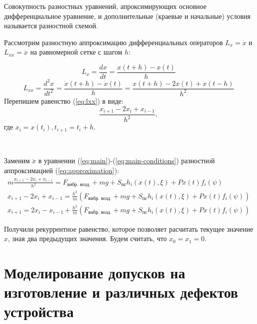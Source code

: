 \begin{definition}
    Совокупность разностных уравнений, апроксимирующих основное дифференциальное уравнение, и дополнительные
    (краевые и начальные) условия называется разностной схемой.
\end{definition}

Рассмотрим разностную аппроксимацию дифференциальных операторов $L_x = \dot{x}$ и $L_{xx} = \ddot{x}$ на равномерной сетке
с шагом $h$:

\begin{equation}
    L_x = \frac{dx}{dt} = \frac{x(t + h) - x(t)}{h}
\end{equation}
\begin{equation}
    \label{eq:lxx}
    L_{xx} = \frac{d^2x}{dt^2} = \frac{\dot{x}(t + h) - \dot{x}(t)}{h} = \frac{x(t + h) - 2x(t) + x(t - h)}{h^2}
\end{equation}
Перепишем равенство (\ref{eq:lxx}) в виде:
\begin{equation}
    \label{eq:approximation}
    \frac{x_{i+1} - 2x_i + x_{i-1}}{h^2},
\end{equation}
где $x_i = x(t_i), t_{i+1} = t_i + h$.

~\

\noindent Заменим $\ddot{x}$ в уравнении (\ref{eq:main})-(\ref{eq:main-conditions}) разностной аппроксимацией (\ref{eq:approximation}):
\begin{equation}
    \label{eq:result}
    \begin{aligned}
        m\frac{x_{i+1} - 2x_i + x_{i-1}}{h^2} = F_\text{вибр. возд.} + mg + S_\text{пс} h_i(x(t), \xi)+ P x(t) f_i(\psi)\\
        x_{i+1} - 2x_i + x_{i-1} = \frac{h^2}{m}(F_\text{вибр. возд.} + mg + S_\text{пс} h_i(x(t), \xi) + P x(t) f_i(\psi))\\
        x_{i+1} = 2x_i - x_{i-1} + \frac{h^2}{m}(F_\text{вибр. возд.} + mg + S_\text{пс} h_i(x(t), \xi) + P x(t) f_i(\psi))
    \end{aligned}
\end{equation}

\noindent Получили рекуррентное равенство, которое позволяет расчитать текущее значение $x$, зная два предыдущих значения. Будем
считать, что $x_0 = x_1 = 0$.

\clearpage

\section{Моделирование допусков на изготовление и различных дефектов устройства}

